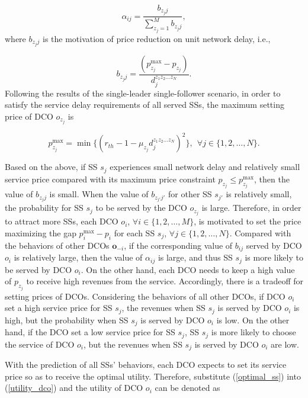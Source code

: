 \documentclass[twocolumn,10pt]{IEEEtran}
\begin{document}
\begin{equation}
    \alpha_{ij}= \frac{{{b_{{z_j}j}}}}{{\sum\limits_{{z_j} = 1}^M {{b_{{z_j}j}}} }},
\end{equation}
where ${b_{{z_j}j}}$ is the motivation of price reduction on unit network delay, i.e.,

\begin{equation}
    {b_{{z_j}j}} = \frac{{(p_{{z_j}}^{\max } - {p_{{z_j}}})}}{{d_j^{{z_1}{z_2}\ldots{z_N}}}}.
\end{equation}
Following the results of the single-leader single-follower scenario, in order to satisfy the service delay requirements of all served SSs, the maximum setting price of DCO $o_{z_j}$ is

\begin{equation}
    p_{{z_j}}^{\max }= \min \{{({r_{th}} - 1 - {\mu _{z_j}}{d_j^{{z_1}{z_2}\ldots {z_N}}})^2} \}, ~~ \forall j\in\{1,2,\ldots,N\}.
\end{equation}

Based on the above, if SS $s_j$ experiences small network delay and relatively small service price compared with its maximum price constraint $p_{{z_j}}\leq p_{{z_j}}^{\max }$, then the value of $b_{{z_j}j}$ is small. When the value of $b_{{z_{j'}}{j'}}$ for other SS $s_{j'}$ is relatively small, the probability for SS $s_j$ to be served by the DCO $o_{z_j}$ is large. Therefore, in order to attract more SSs, each DCO $o_i$, $\forall i \in \{1,2,\ldots,M\}$, is motivated to set the price maximizing the gap $p_{{i}}^{\max } - p_{{i}}$ for each SS $s_j$, $\forall j \in \{1,2,\ldots,N\}$. Compared with the behaviors of other DCOs $\mathbf{o}_{-i}$, if the corresponding value of $b_{ij}$ served by DCO $o_i$ is relatively large, then the value of $\alpha_{ij}$ is large, and thus SS $s_j$ is more likely to be served by DCO $o_i$. On the other hand, each DCO needs to keep a high value of $p_{{z_j}}$ to receive high revenues from the service. Accordingly, there is a tradeoff for setting prices of DCOs. Considering the behaviors of all other DCOs, if DCO $o_i$ set a high service price for SS $s_j$, the revenues when SS $s_j$ is served by DCO $o_i$ is high, but the probability when SS $s_j$ is served by DCO $o_i$ is low. On the other hand, if the DCO set a low service price for SS $s_j$, SS $s_j$ is more likely to choose the service of DCO $o_i$, but the revenues when SS $s_j$ is served by DCO $o_i$ are low.




With the prediction of all SSs' behaviors, each DCO expects to set its service price so as to receive the optimal utility. Therefore, substitute (\ref{optimal_ss}) into (\ref{utility_dco}) and the utility of DCO $o_i$ can be denoted as
\end{document}
